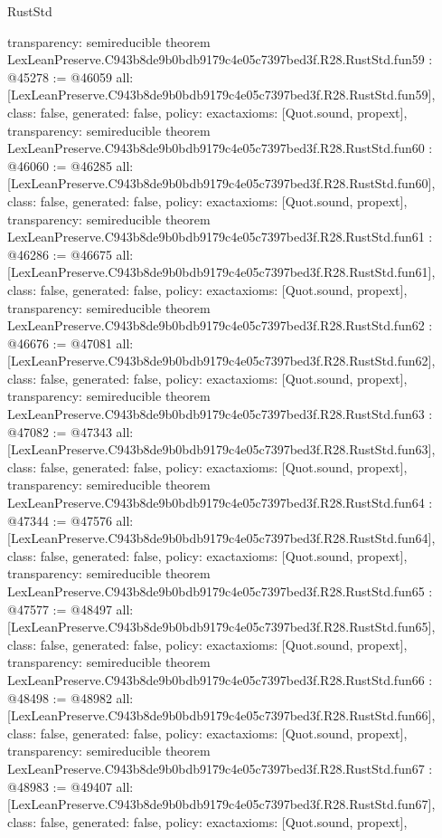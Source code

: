 \begin{lexlean}{RustStd}
\begin{coremodule}
{  transparency: semireducible
}
theorem LexLeanPreserve.C943b8de9b0bdb9179c4e05c7397bed3f.R28.RustStd.fun59 : @45278 := @46059 {
  all: [LexLeanPreserve.C943b8de9b0bdb9179c4e05c7397bed3f.R28.RustStd.fun59],
  class: false,
  generated: false,
  policy: exact{axioms: [Quot.sound, propext]},
  transparency: semireducible
}
theorem LexLeanPreserve.C943b8de9b0bdb9179c4e05c7397bed3f.R28.RustStd.fun60 : @46060 := @46285 {
  all: [LexLeanPreserve.C943b8de9b0bdb9179c4e05c7397bed3f.R28.RustStd.fun60],
  class: false,
  generated: false,
  policy: exact{axioms: [Quot.sound, propext]},
  transparency: semireducible
}
theorem LexLeanPreserve.C943b8de9b0bdb9179c4e05c7397bed3f.R28.RustStd.fun61 : @46286 := @46675 {
  all: [LexLeanPreserve.C943b8de9b0bdb9179c4e05c7397bed3f.R28.RustStd.fun61],
  class: false,
  generated: false,
  policy: exact{axioms: [Quot.sound, propext]},
  transparency: semireducible
}
theorem LexLeanPreserve.C943b8de9b0bdb9179c4e05c7397bed3f.R28.RustStd.fun62 : @46676 := @47081 {
  all: [LexLeanPreserve.C943b8de9b0bdb9179c4e05c7397bed3f.R28.RustStd.fun62],
  class: false,
  generated: false,
  policy: exact{axioms: [Quot.sound, propext]},
  transparency: semireducible
}
theorem LexLeanPreserve.C943b8de9b0bdb9179c4e05c7397bed3f.R28.RustStd.fun63 : @47082 := @47343 {
  all: [LexLeanPreserve.C943b8de9b0bdb9179c4e05c7397bed3f.R28.RustStd.fun63],
  class: false,
  generated: false,
  policy: exact{axioms: [Quot.sound, propext]},
  transparency: semireducible
}
theorem LexLeanPreserve.C943b8de9b0bdb9179c4e05c7397bed3f.R28.RustStd.fun64 : @47344 := @47576 {
  all: [LexLeanPreserve.C943b8de9b0bdb9179c4e05c7397bed3f.R28.RustStd.fun64],
  class: false,
  generated: false,
  policy: exact{axioms: [Quot.sound, propext]},
  transparency: semireducible
}
theorem LexLeanPreserve.C943b8de9b0bdb9179c4e05c7397bed3f.R28.RustStd.fun65 : @47577 := @48497 {
  all: [LexLeanPreserve.C943b8de9b0bdb9179c4e05c7397bed3f.R28.RustStd.fun65],
  class: false,
  generated: false,
  policy: exact{axioms: [Quot.sound, propext]},
  transparency: semireducible
}
theorem LexLeanPreserve.C943b8de9b0bdb9179c4e05c7397bed3f.R28.RustStd.fun66 : @48498 := @48982 {
  all: [LexLeanPreserve.C943b8de9b0bdb9179c4e05c7397bed3f.R28.RustStd.fun66],
  class: false,
  generated: false,
  policy: exact{axioms: [Quot.sound, propext]},
  transparency: semireducible
}
theorem LexLeanPreserve.C943b8de9b0bdb9179c4e05c7397bed3f.R28.RustStd.fun67 : @48983 := @49407 {
  all: [LexLeanPreserve.C943b8de9b0bdb9179c4e05c7397bed3f.R28.RustStd.fun67],
  class: false,
  generated: false,
  policy: exact{axioms: [Quot.sound, propext]},
}
\end{coremodule}
\end{lexlean}

